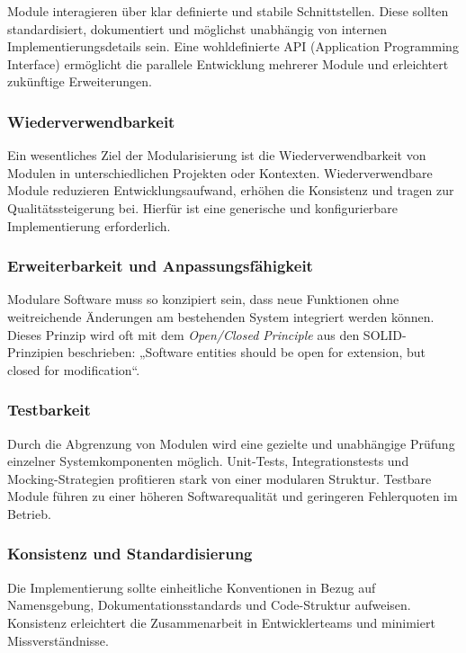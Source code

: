 Module interagieren über klar definierte und stabile Schnittstellen.
Diese sollten standardisiert, dokumentiert und möglichst unabhängig von internen Implementierungsdetails sein.
Eine wohldefinierte API (Application Programming Interface) ermöglicht die parallele Entwicklung mehrerer Module und erleichtert zukünftige Erweiterungen.


\subsubsection{Wiederverwendbarkeit}

Ein wesentliches Ziel der Modularisierung ist die Wiederverwendbarkeit von Modulen in unterschiedlichen Projekten oder Kontexten.
Wiederverwendbare Module reduzieren Entwicklungsaufwand, erhöhen die Konsistenz und tragen zur Qualitätssteigerung bei.
Hierfür ist eine generische und konfigurierbare Implementierung erforderlich.


\subsubsection{Erweiterbarkeit und Anpassungsfähigkeit}

Modulare Software muss so konzipiert sein, dass neue Funktionen ohne weitreichende Änderungen am bestehenden System integriert werden können.
Dieses Prinzip wird oft mit dem \textit{Open/Closed Principle} aus den SOLID-Prinzipien beschrieben: „Software entities should be open for extension, but closed for modification“.


\subsubsection{Testbarkeit}

Durch die Abgrenzung von Modulen wird eine gezielte und unabhängige Prüfung einzelner Systemkomponenten möglich.
Unit-Tests, Integrationstests und Mocking-Strategien profitieren stark von einer modularen Struktur.
Testbare Module führen zu einer höheren Softwarequalität und geringeren Fehlerquoten im Betrieb.


\subsubsection{Konsistenz und Standardisierung}

Die Implementierung sollte einheitliche Konventionen in Bezug auf Namensgebung, Dokumentationsstandards und Code-Struktur aufweisen.
Konsistenz erleichtert die Zusammenarbeit in Entwicklerteams und minimiert Missverständnisse.


\pagebreak
